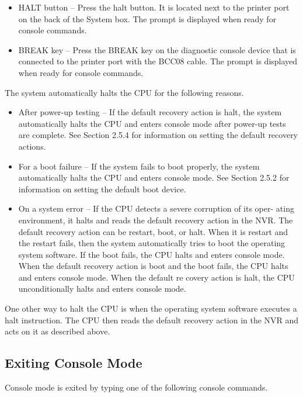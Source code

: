 \begin{itemize}
\item HALT button -- Press the halt button. It is located next to the printer port
on the back of the System box. The \console prompt is displayed when
ready for console commands.
\item BREAK key -- Press the BREAK key on the diagnostic console device
that is connected to the printer port with the BCC08 cable. The \console
prompt is displayed when ready for console commands.
\end{itemize}
The system automatically halts the CPU for the following reasons.
\begin{itemize}
\item After power-up testing -- If the default recovery action is halt, the system
automatically halts the CPU and enters console mode after power-up
tests are complete. See Section 2.5.4 for information on setting the
default recovery actions.
\item For a boot failure -- If the system fails to boot properly, the system 
automatically halts the CPU and enters console mode. See Section 2.5.2
for information on setting the default boot device.
\item On a system error -- If the CPU detects a severe corruption of its oper-
ating environment, it halts and reads the default recovery action in the
NVR. The default recovery action can be restart, boot, or halt. When
it is restart and the restart fails, then the system automatically tries to
boot the operating system software. If the boot fails, the CPU halts and
enters console mode. When the default recovery action is boot and the
boot fails, the CPU halts and enters console mode. When the default re
covery action is halt, the CPU unconditionally halts and enters console
mode.
\end{itemize}

One other way to halt the CPU is when the operating system software 
executes a halt instruction. The CPU then reads the default recovery action in
the NVR and acts on it as described above.

\subsection{Exiting Console Mode}

Console mode is exited by typing one of the following console commands.

